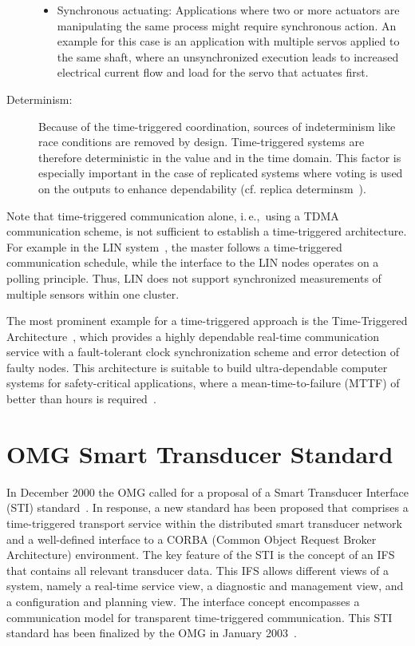 \documentclass[11pt,a4paper,]{article}
\def\ie{i.\,e.,~}
\begin{document}
\begin{description}
\begin{itemize}
\item Synchronous actuating: Applications where two or more
actuators are manipulating the same process might require
synchronous action. An example for this case is an application
with multiple servos applied to the same shaft, where an
unsynchronized execution leads to increased electrical current
flow and load for the servo that actuates first.

\end{itemize}

\item[Determinism:] Because of the time-triggered coordination,
sources of indeterminism like race conditions are removed by
design. Time-triggered systems are therefore deterministic in the
value and in the time domain. This factor is especially important
in the case of replicated systems where voting is used on the
outputs to enhance dependability (cf. replica
determinsm~\cite{poledna:diss}).

\end{description}

Note that time-triggered communication alone, \ie using a \ac{TDMA}
communication scheme, is not sufficient to establish a
time-triggered architecture. For example in the \ac{LIN}
system~\cite{linspec}, the master follows a time-triggered
communication schedule, while the interface to the \ac{LIN} nodes
operates on a polling principle. Thus, \ac{LIN} does not support
synchronized measurements of multiple sensors within one cluster.

The most prominent example for a time-triggered approach is the
Time-Triggered Architecture~\cite{kopetz:2001-22}, which provides
a highly dependable real-time communication service with a
fault-tolerant clock synchronization scheme and error detection of
faulty nodes. This architecture is suitable to build
ultra-dependable computer systems for safety-critical
applications, where a mean-time-to-failure (MTTF) of better than
 hours is required~\cite{suri:95,kopetz:faulthypothesis}.

\section{OMG Smart Transducer Standard} \label{sec:omg-transducer-standard}

In December 2000 the \ac{OMG} called for a proposal of a Smart
Transducer Interface (STI)
standard~\cite{omg:SmartTransducerInterfaceRFP}. In response, a new
standard has been proposed that comprises a time-triggered transport
service within the distributed smart transducer network and a
well-defined interface to a CORBA (Common Object Request Broker
Architecture) environment. The key feature of the STI is the concept
of an \ac{IFS} that contains all relevant transducer data. This
\ac{IFS} allows different views of a system, namely a real-time
service view, a diagnostic and management view, and a configuration
and planning view. The interface concept encompasses a communication
model for transparent time-triggered communication. This STI
standard has been finalized by the \ac{OMG} in January
2003~\cite{omg:SmartTransducerInterface1.0}.
\end{document}
